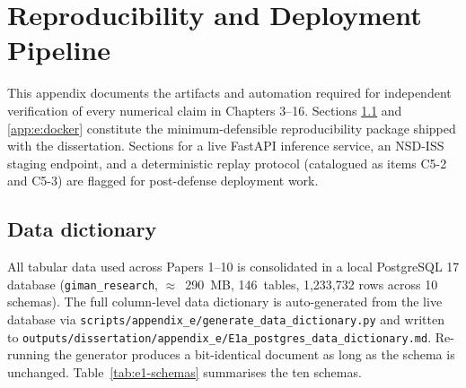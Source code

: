\chapter{Reproducibility and Deployment Pipeline}
\label{app:reproducibility}

This appendix documents the artifacts and automation required for independent
verification of every numerical claim in Chapters 3--16. Sections
\ref{app:e:data-dict} and \ref{app:e:docker} constitute the minimum-defensible
reproducibility package shipped with the dissertation. Sections for a live
FastAPI inference service, an NSD-ISS staging endpoint, and a deterministic
replay protocol (catalogued as items C5-2 and C5-3) are flagged for post-defense
deployment work.

\section{Data dictionary}
\label{app:e:data-dict}

All tabular data used across Papers 1--10 is consolidated in a local PostgreSQL
17 database (\texttt{giman\_research}, $\approx$~290~MB, 146~tables,
1{,}233{,}732 rows across 10 schemas). The full column-level data dictionary is
auto-generated from the live database via
\texttt{scripts/appendix\_e/generate\_data\_dictionary.py} and written to
\texttt{outputs/dissertation/appendix\_e/E1a\_postgres\_data\_dictionary.md}.
Re-running the generator produces a bit-identical document as long as the
schema is unchanged. Table~\ref{tab:e1-schemas} summarises the ten schemas.

